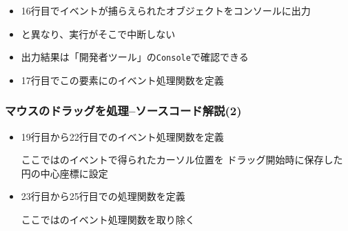 \begin{frame}[containsverbatim]
\begin{frame}[containsverbatim]
\begin{itemize}
\begin{itemize}
	 \item 16行目でイベントが捕らえられたオブジェクトをコンソールに出力
	 \item {}と異なり、実行がそこで中断しない
	 \item 出力結果は「開発者ツール」の\texttt{Console}で確認できる
   \item 17行目でこの要素にのイベント処理関数を定義
  \end{itemize}
\end{itemize}
\end{frame}
\begin{frame}
 \frametitle{マウスのドラッグを処理--ソースコード解説(2)}
\begin{itemize}
\item 19行目から22行目でのイベント処理関数を定義

      ここではのイベントで得られたカーソル位置を
      ドラッグ開始時に保存した円の中心座標に設定
 \item 23行目から25行目での処理関数を定義

       ここではのイベント処理関数を取り除く
\end{itemize}


\end{frame}
\end{frame}
